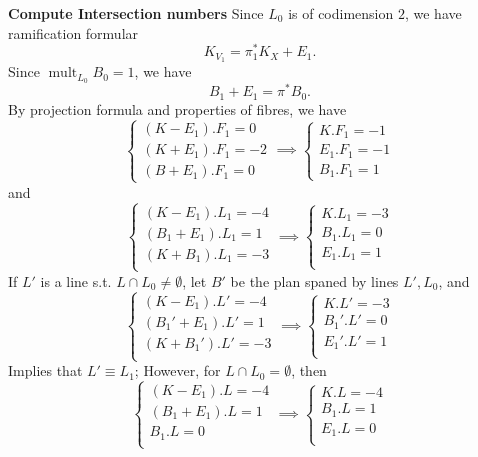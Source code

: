 \documentclass{article}
\begin{document}
\textbf{Compute Intersection numbers}
Since $ L_0 $ is of codimension $ 2 $, we have ramification formular
\[ K_{V_1}=\pi_1^* K_X+E_1. \]
Since $ \operatorname{mult}_{L_0}B_0=1 $, we have
\[ B_1+E_1=\pi^*B_0. \]
By projection formula and properties of fibres, we have
\[ \begin{cases}
	(K-E_1).F_1=0\\
	(K+E_1).F_1=-2\\
	(B + E_1).F_1 = 0
\end{cases} \implies
\begin{cases}
	K.F_1=-1\\
	E_1.F_1=-1\\
	B_1.F_1 = 1 
\end{cases}\]
and
\[
\begin{cases}
	(K-E_1).L_1=-4\\
	(B_1+E_1).L_1=1\\
	(K+B_1).L_1=-3\\
\end{cases}
\implies
\begin{cases}
	K.L_1=-3\\
	B_1.L_1=0\\
	E_1.L_1=1\\
\end{cases}
\]
If $ L' $ is a line s.t.  $ L\cap L_0\neq \emptyset $, let $ B' $ be the plan spaned by lines $ L',L_0 $, and 
\[
\begin{cases}
	(K-E_1).L'=-4\\
	(B_1'+E_1).L'=1\\
	(K+B_1').L'=-3\\
\end{cases}
\implies
\begin{cases}
	K.L'=-3\\
	B_1'.L'=0\\
	E_1'.L'=1\\
\end{cases}
\]
Implies that $ L'\equiv L_1 $; However, for $ L \cap L_0=\emptyset $, then
\[
\begin{cases}
	(K-E_1).L=-4\\
	(B_1+E_1).L=1\\
	B_1.L = 0\\
\end{cases}
\implies
\begin{cases}
	K.L=- 4\\
	B_1.L = 1\\
	E_1.L = 0\\
\end{cases}
\]
\end{document}
